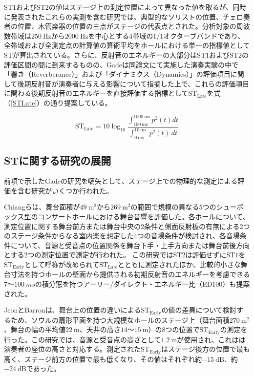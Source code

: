 \documentclass[11pt,a4j]{jreport}
\begin{document}
$\mathrm{ST1}$および$\mathrm{ST2}$の値はステージ上の測定位置によって異なった値を取るが、同時に発表されたこれらの実測を含む研究\cite{Gade1989II}では、典型的なソリストの位置、チェロ奏者の位置、木管楽器の位置の三点がステージの代表点とされた。分析対象の周波数帯域は$\SI{250}{\Hz}$から$\SI{2000}{\Hz}$を中心とする4帯域の1/1オクターブバンドであり、全帯域および全測定点の計算値の算術平均をホールにおける単一の指標値として$\mathrm{ST}$が算出されている。さらに、反射音のエネルギーの大部分は$\mathrm{ST1}$および$\mathrm{ST2}$の評価区間の間に到来するものの、Gadeは同論文にて実施した演奏実験の中で「響き（Reverberance）」および「ダイナミクス（Dynamics）」の評価項目に関して後期反射音が演奏者に与える影響について指摘した上で、これらの評価項目に関わる後期反射音のエネルギーを直接評価する指標として$\mathrm{ST_{Late}}$を式（\ref{STLate}）の通り提案している。
  
\begin{equation}
  \label{STLate}
  \mathrm{ST_{Late}}= 10 \log_{10}
  \frac{\int_{100 \: \mathrm{ms}}^{1000 \: \mathrm{ms}} p^2(t) dt}
  {\int_{0 \: \mathrm{ms}}^{10 \: \mathrm{ms}} \: p^2(t) \: dt}
\end{equation}


\subsection{STに関する研究の展開}
前項で示したGadeの研究を嚆矢として、ステージ上での物理的な測定による評価を含む研究がいくつか行われた。

Chiangら\cite{chiang2003}は、舞台面積が$\SI{49}{\m^2}$から$\SI{269}{\m^2}$の範囲で規模の異なる5つのシューボックス型のコンサートホールにおける舞台音響を評価した。各ホールについて、測定位置に関する舞台前方または舞台中央の2条件と側面反射板の有無による2つのステージ条件からなる室内楽を想定した4つの音場条件が検討され、各音場条件について、音源と受音点の位置関係を舞台下手・上手方向または舞台前後方向とする2つの測定位置で測定が行われた。
この研究では$\mathrm{ST2}$は評価せずに$\mathrm{ST1}$を$\mathrm{ST_{Early}}$として呼称が改められて$\mathrm{ST_{Late}}$とともに測定されたほか、比較的小さな舞台寸法を持つホールの壁面から提供される初期反射音のエネルギーを考慮できる$7$〜$\SI{100}{ms}$の積分窓を持つアーリー/ダイレクト・エネルギー比（ED100）も提案された。

JeonとBarron\cite{jeon2005}は、舞台上の位置の違いによる$\mathrm{ST_{Early}}$の値の差異について検討するため、ソウルの扇形平面を持つ大規模なホールのステージ上（舞台面積$\SI{270}{\m^2}$、舞台の幅の平均値$\SI{22}{\m}$、天井の高さ$14$〜$\SI{15}{\m}$）の8つの位置で$\mathrm{ST_{Early}}$の測定を行った。この研究では、音源と受音点の高さとして$\SI{1.2}{\m}$が使用され、これはは演奏者の座位の高さと対応する。測定された$\mathrm{ST_{Early}}$はステージ後方の位置で最も高く、ステージ前方の位置で最も低くなり、その値はそれぞれ約$\SI{-15}{\dB}$、約$\SI{-24}{\dB}$であった。
\end{document}

